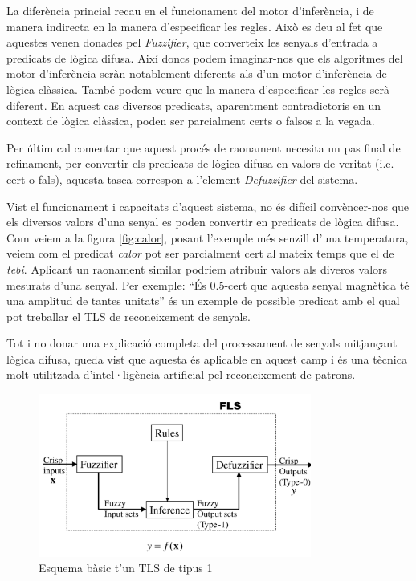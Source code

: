 \documentclass[11pt,a4paper]{article}
\begin{document}
La diferència princial recau en el funcionament del motor d'inferència, i de manera indirecta en la manera d'especificar les regles. Això es deu al fet que aquestes venen donades pel \emph{Fuzzifier}, que converteix les senyals d'entrada a predicats de lògica difusa. Així doncs podem imaginar-nos que els algoritmes del motor d'inferència seràn notablement diferents als d'un motor d'inferència de lògica clàssica. També podem veure que la manera d'especificar les regles serà diferent. En aquest cas diversos predicats, aparentment contradictoris en un context de lògica clàssica, poden ser parcialment certs o falsos a la vegada.

Per últim cal comentar que aquest procés de raonament necesita un pas final de refinament, per convertir els predicats de lògica difusa en valors de veritat (i.e. cert o fals), aquesta tasca correspon a l'element \emph{Defuzzifier} del sistema.

Vist el funcionament i capacitats d'aquest sistema, no és difícil convèncer-nos que els diversos valors d'una senyal es poden convertir en predicats de lògica difusa. Com veiem a la figura \ref{fig:calor}, posant l'exemple més senzill d'una temperatura, veiem com el predicat \emph{calor} pot ser parcialment cert al mateix temps que el de \emph{tebi}. Aplicant un raonament similar podriem atribuir valors als diveros valors mesurats d'una senyal. Per exemple: ``És 0.5-cert que aquesta senyal magnètica té una amplitud de tantes unitats'' és un exemple de possible predicat amb el qual pot treballar el TLS de reconeixement de senyals.

Tot i no donar una explicació completa del processament de senyals mitjançant lògica difusa, queda vist que aquesta és aplicable en aquest camp i és una tècnica molt utilitzada d'intel·ligència artificial pel reconeixement de patrons.

\begin{figure}[hbt]
\centering
\includegraphics[width=0.8\textwidth]{./fig/tls1.png}
\caption{Esquema bàsic t'un TLS de tipus 1}
\label{fig:tls-1}
\end{figure}
\end{document}
